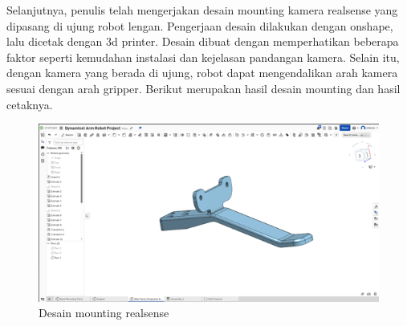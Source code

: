 Selanjutnya, penulis telah mengerjakan desain mounting kamera realsense yang dipasang di ujung robot lengan.
Pengerjaan desain dilakukan dengan onshape, lalu dicetak dengan 3d printer. Desain dibuat dengan memperhatikan
beberapa faktor seperti kemudahan instalasi dan kejelasan pandangan kamera. Selain itu, dengan kamera yang
berada di ujung, robot dapat mengendalikan arah kamera sesuai dengan arah gripper. Berikut merupakan hasil desain mounting
dan hasil cetaknya.

\begin{figure} [H] \centering
    \includegraphics[scale=0.7]{gambar/desain mounting realsense.png}
    \caption{Desain mounting realsense}
    \label{fig:realsense_mounting}
\end{figure}
